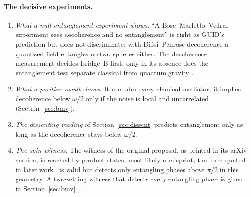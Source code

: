 \paragraph{The decisive experiments.}
\begin{enumerate}
\item \emph{What a null entanglement experiment shows.} ``A Bose--Marletto--Vedral experiment sees decoherence and no entanglement'' is right
as GUID's prediction but does not discriminate: with Di\'osi--Penrose decoherence a quantised field entangles no two spheres either. The
decoherence measurement decides Bridge~B first; only in its absence does the entanglement test separate classical from quantum gravity
.
\item \emph{What a positive result shows.} It excludes every classical mediator; it implies decoherence below $\omega/2$ only if the noise is
local and uncorrelated (Section~\ref{sec:bmv}).
\item \emph{The dissenting reading} of Section~\ref{sec:dissent} predicts entanglement only as long as the decoherence stays below $\omega/2$.
\item \emph{The spin witness.} The witness of the original proposal, as printed in its arXiv version, is reached by product states, most
likely a misprint; the form quoted in later work~\cite{chevalier2020} is valid but detects only entangling phases above $\pi/2$ in this
geometry. A two-setting witness that detects every entangling phase is given in Section~\ref{sec:bmv} , .
\end{enumerate}

